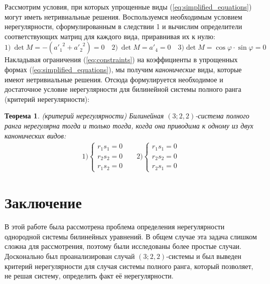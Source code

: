 \documentclass[10pt]{article}
\newtheorem{theorem}{Теорема}
\begin{document}
Рассмотрим условия, при которых упрощенные виды (\ref{eq:simplified_equations}) могут иметь 
нетривиальные решения. Воспользуемся необходимым условием нерегулярности, сформулированным 
в следствии 1 и вычислим определители соответствующих матриц для каждого вида, приравнивая 
их к нулю: 
\begin{equation}\label{eq:constraints}
	1)~\det M = -({a'_1}^2 + {a'_2}^2)=0 \quad  2)~\det M = a'_{4}=0 \quad 3)\det M = \cos \varphi \cdot \sin \varphi =0
\end{equation}
Накладывая ограничения (\ref{eq:constraints}) на коэффициенты в упрощенных формах 
(\ref{eq:simplified_equations}), мы получим \textit{канонические} виды, которые имеют 
нетривиальные решения. Отсюда формулируется необходимое и достаточное условие 
нерегулярности для билинейной системы полного ранга (критерий нерегулярности): 
\begin{theorem}(критерий нерегулярности)
	Билинейная $(3;2,2)$-система полного ранга нерегулярна тогда и только тогда, когда она 
	приводима к одному из двух канонических видов: 
	\begin{align*}
		&
		1)\begin{cases}
		 	r_1 s_1 = 0 \\
		 	r_2 s_2 = 0 \\
		 	r_1 s_2 = 0 &
		\end{cases}
		&
		2)\begin{cases}
			r_1 s_1 = 0 \\
		 	r_2 s_2 = 0 \\
		 	r_2 s_1 = 0 &
		\end{cases}
	\end{align*}
\end{theorem} 

\section{Заключение}
В этой работе была рассмотрена проблема определения нерегулярности однородной системы 
билинейных уравнений. В общем случае эта задача слишком сложна для рассмотрения, поэтому 
были исследованы более простые случаи. Досконально был проанализирован случай $(3;2,2)$-системы и был выведен критерий нерегулярности для случая системы полного ранга, который позволяет, не решая систему, определить факт её нерегулярности. 

\printbibliography
\end{document}
